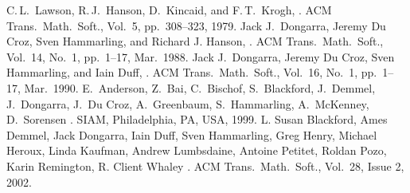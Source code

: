 \begin{thebibliography}{99}
  C.\,L.\ Lawson, R.\,J.\ Hanson, D.\ Kincaid, and F.\,T.\ Krogh,
  .
  ACM Trans.\ Math.\ Soft., Vol.\ 5, pp.\ 308--323, 1979.
  Jack J.\ Dongarra, Jeremy Du Croz, Sven Hammarling, and Richard J. Hanson,
  .
  ACM Trans.\ Math.\ Soft., Vol.\ 14, No.\ 1, pp.\ 1--17, Mar.\ 1988.
  Jack J.\ Dongarra, Jeremy Du Croz, Sven Hammarling, and Iain Duff,
  .
  ACM Trans.\ Math.\ Soft., Vol.\ 16, No.\ 1, pp.\ 1--17, Mar.\ 1990.
  E.\ Anderson, Z.\ Bai, C.\ Bischof, S.\ Blackford, J.\ Demmel, J.\ Dongarra,
  J.\ Du Croz, A.\ Greenbaum, S.\ Hammarling, A.\ McKenney, D.\ Sorensen
  .
  SIAM, Philadelphia, PA, USA, 1999.
  L. Susan Blackford, Ames Demmel, Jack Dongarra, Iain Duff, Sven Hammarling,
  Greg Henry, Michael Heroux, Linda Kaufman, Andrew Lumbsdaine, Antoine Petitet,
  Roldan Pozo, Karin Remington, R. Client Whaley
  .
  ACM Trans.\ Math.\ Soft., Vol.\ 28, Issue 2, 2002.
\end{thebibliography}

\let\realglossitem\glossitem
\renewcommand{\glossitem}[4]{\hangpara{4em}{1}\realglossitem{#1}{#2}{#3}{#4}}

\clearpage
\renewcommand{\glossaryname}{Cross-references}
\renewcommand{\preglossaryhook}{Each clause and subclause label is listed below along with the
corresponding clause or subclause number and page number, in alphabetical order by label.\\}
\twocolglossary
\renewcommand{\leftmark}{\glossaryname}
{
\raggedright
\printglossary[xrefindex]
}

\clearpage

\renewcommand{\glossaryname}{Cross-references from ISO \CppXXIII{}}
\renewcommand{\preglossaryhook}{All clause and subclause labels from
ISO \CppXXIII{} (ISO/IEC 14882:2023, \doccite{Programming Languages --- \Cpp{}})
are present in this document, with the exceptions described below.\\}
\renewcommand{\leftmark}{\glossaryname}
{
\raggedright
\printglossary[xrefdelta]
}

\clearpage
\renewcommand{\leftmark}{\indexname}
\renewcommand{\preindexhook}{Constructions whose name appears in \exposid{monospaced italics} are for exposition only.\\}
{
\raggedright
\printindex[generalindex]
}

